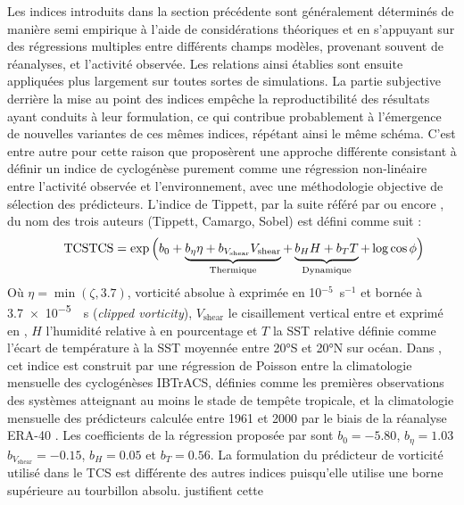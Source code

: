\documentclass[../main.tex]{subfiles}
\begin{document}
Les indices introduits dans la section précédente sont généralement déterminés de manière semi empirique à l'aide de considérations théoriques et en s'appuyant
sur des régressions multiples entre différents champs modèles, provenant souvent de réanalyses, et l'activité observée. Les relations ainsi établies sont
ensuite appliquées plus largement sur toutes sortes de simulations. La partie subjective derrière la mise au point des indices empêche la reproductibilité des
résultats ayant conduits à leur formulation, ce qui contribue probablement à l'émergence de nouvelles variantes de ces mêmes indices, répétant ainsi le même
schéma. C'est entre autre pour cette raison que \textcite{tippett_poisson_2011} proposèrent une approche différente consistant à définir un indice de
cyclogénèse purement comme une régression non-linéaire entre l'activité observée et l'environnement, avec une méthodologie objective de sélection des
prédicteurs. L'indice de Tippett, par la suite référé par  ou encore , du nom des trois auteurs (Tippett, Camargo, Sobel) est
défini comme suit :
%
\begin{equation*}
    \tag*{TCS}
    \mathrm{TCS} = \exp \Big( b_0 + \underbrace{b_\eta \eta + b_{V_{\mathrm{shear}}} V_{\mathrm{shear}}}_{\mathrm{Thermique}} + \underbrace{\vphantom{b_\eta}b_H H + b_T
    T}_{\mathrm{Dynamique}} + \log \cos \phi \Big)
\end{equation*}
%
Où $\eta = \min (\zeta, \num{3.7})$, vorticité absolue à  exprimée en 10$^{-5}$~s$^{-1}$ et bornée à \SI{3.7e-5}{\per\second} (\textit{clipped
vorticity}), $V_{\mathrm{shear}}$ le cisaillement vertical entre  et  exprimé en \ms{}, $H$ l'humidité relative à  en pourcentage et
$T$ la SST relative définie comme l'écart de température à la SST moyennée entre \ang{20}S et \ang{20}N sur océan. Dans \textcite{tippett_poisson_2011}, cet
indice est construit par une régression de Poisson entre la climatologie mensuelle des cyclogénèses IBTrACS, définies comme les premières observations des
systèmes atteignant au moins le stade de tempête tropicale, et la climatologie mensuelle des prédicteurs calculée entre \num{1961} et \num{2000} par le biais de
la réanalyse ERA-40 \parencite{uppala_era40_2005}. Les coefficients de la régression proposée par \citeauthor{tippett_poisson_2011} sont $b_0 = \num{-5.80}$,
$b_{\eta} = \num{1.03}$ $b_{V_{\mathrm{shear}}} = \num{-0.15}$, $b_H = \num{0.05}$ et $b_T = \num{0.56}$. La formulation du prédicteur de vorticité utilisé dans
le TCS est différente des autres indices puisqu'elle utilise une borne supérieure au tourbillon absolu. \textcite{tippett_poisson_2011} justifient cette
\end{document}
